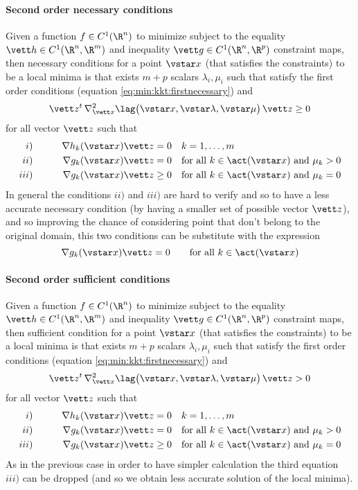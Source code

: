 	\paragraph{Second order necessary conditions} Given a function $f \in C^1(\R^n)$ to minimize subject to the equality $\vett h\in C^1(\R^n,\R^m)$ and inequality $\vett g \in C^1(\R^n,\R^p)$ constraint maps, then necessary conditions for a point $\vstar x$ (that satisfies the constraints) to be a local minima is that exists $m+p$ scalars $\lambda_i,\mu_i$ such that satisfy the first order conditions (equation \ref{eq:min:kkt:firstnecessary}) and
	\begin{equation}
		\vett z^t \, \nabla^2_{\vett x} \lag\big(\vstar x,\vstar \lambda,\vstar \mu\big) \, \vett z \geq 0
	\end{equation}	
	for all vector $\vett z$ such that
	\begin{align*}
		i) \qquad && \nabla h_k(\vstar x) \vett z & = 0 && k = 1,\dots,m \\
		ii) \qquad &&\nabla g_k(\vstar x) \vett z & = 0 && \textrm{for all } k\in \act(\vstar x) \textrm{ and } \mu_k > 0 \\
		iii) \qquad &&\nabla g_k(\vstar x) \vett z & \geq 0 && \textrm{for all } k\in \act(\vstar x) \textrm{ and } \mu_k = 0
	\end{align*}
	In general the conditions $ii)$ and $iii)$ are hard to verify and so to have a less accurate necessary condition (by having a smaller set of possible vector $\vett z$), and so improving the chance of considering point that don't belong to the original domain, this two conditions can be substitute with the expression
	\[ \nabla g_k(\vstar x) \vett z = 0 \qquad \textrm{for all } k \in \act(\vstar x) \]
	
	\paragraph{Second order sufficient conditions} Given a function $f \in C^1(\R^n)$ to minimize subject to the equality $\vett h\in C^1(\R^n,\R^m)$ and inequality $\vett g \in C^1(\R^n,\R^p)$ constraint maps, then sufficient condition for a point $\vstar x$ (that satisfies the constraints) to be a local minima is that exists $m+p$ scalars $\lambda_i,\mu_i$ such that satisfy the first order conditions (equation \ref{eq:min:kkt:firstnecessary}) and 
	\begin{equation}
		\vett z^t \, \nabla^2_{\vett x} \lag\big(\vstar x,\vstar \lambda,\vstar \mu\big) \, \vett z > 0
	\end{equation}	
	for all vector $\vett z$ such that
	\begin{align*}
		i) \qquad && \nabla h_k(\vstar x) \vett z & = 0 && k = 1,\dots,m \\
		ii) \qquad &&\nabla g_k(\vstar x) \vett z & = 0 && \textrm{for all } k\in \act(\vstar x) \textrm{ and } \mu_k > 0 \\
		iii) \qquad &&\nabla g_k(\vstar x) \vett z & \geq 0 && \textrm{for all } k\in \act(\vstar x) \textrm{ and } \mu_k = 0
	\end{align*}
	As in the previous case in order to have simpler calculation the third equation $iii)$ can be dropped (and so we obtain less accurate solution of the local minima).
	
